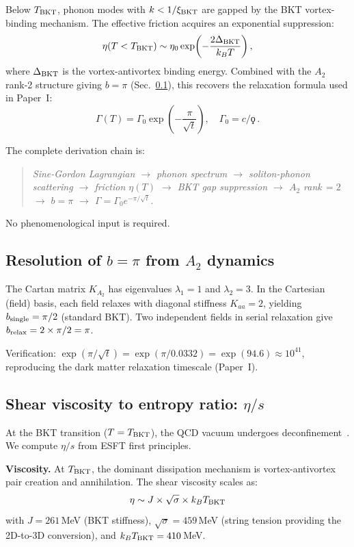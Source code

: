 ﻿\documentclass[twocolumn,showpacs,preprintnumbers,amsmath,amssymb,prd]{revtex4-2}
\begin{document}
Below $T_{\rm BKT}$, phonon modes with $k < 1/\xi_{\rm BKT}$ are gapped by the BKT vortex-binding mechanism. The effective friction acquires an exponential suppression:
\begin{equation}
\eta(T < T_{\rm BKT}) \sim \eta_0 \exp\!\left(-\frac{2\Delta_{\rm BKT}}{k_B T}\right),
\end{equation}
where $\Delta_{\rm BKT}$ is the vortex-antivortex binding energy. Combined with the $A_2$ rank-2 structure giving $b = \pi$ (Sec.~\ref{sec:b_resolution_dynamics}), this recovers the relaxation formula used in Paper~I:
\begin{equation}
\Gamma(T) = \Gamma_0 \exp\!\left(-\frac{\pi}{\sqrt{t}}\right), \quad \Gamma_0 = c/\koppa\,.
\label{eq:Gamma_microscopic}
\end{equation}

The complete derivation chain is:
\begin{quote}
\emph{Sine-Gordon Lagrangian $\to$ phonon spectrum $\to$ soliton-phonon scattering $\to$ friction $\eta(T)$ $\to$ BKT gap suppression $\to$ $A_2$ rank$\,=2$ $\to$ $b = \pi$ $\to$ $\Gamma = \Gamma_0 e^{-\pi/\sqrt{t}}$.}
\end{quote}
No phenomenological input is required.

\subsection{Resolution of $b=\pi$ from $A_2$ dynamics}
\label{sec:b_resolution_dynamics}

The Cartan matrix $K_{A_2}$ has eigenvalues $\lambda_1 = 1$ and $\lambda_2 = 3$. In the Cartesian (field) basis, each field relaxes with diagonal stiffness $K_{aa} = 2$, yielding $b_{\rm single} = \pi/2$ (standard BKT). Two independent fields in serial relaxation give $b_{\rm relax} = 2 \times \pi/2 = \pi$.

Verification: $\exp(\pi/\sqrt{t}) = \exp(\pi/0.0332) = \exp(94.6) \approx 10^{41}$, reproducing the dark matter relaxation timescale (Paper~I).

\subsection{Shear viscosity to entropy ratio: $\eta/s$}
\label{sec:eta_s}

At the BKT transition ($T = T_{\rm BKT}$), the QCD vacuum undergoes deconfinement~\cite{Paper2}. We compute $\eta/s$ from ESFT first principles.

\textbf{Viscosity.} At $T_{\rm BKT}$, the dominant dissipation mechanism is vortex-antivortex pair creation and annihilation. The shear viscosity scales as:
\begin{equation}
\eta \sim J \times \sqrt{\sigma} \times k_B T_{\rm BKT}
\end{equation}
with $J = 261\,$MeV (BKT stiffness), $\sqrt{\sigma} = 459\,$MeV (string tension providing the 2D-to-3D conversion), and $k_B T_{\rm BKT} = 410\,$MeV.
\end{document}
